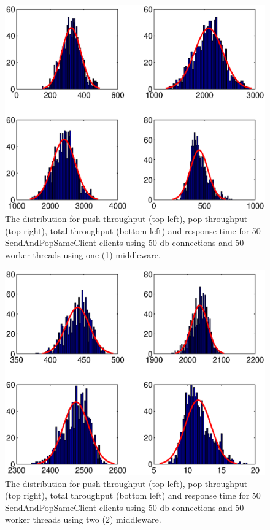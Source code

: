 \documentclass{article}
\begin{document}
        \begin{figure}[hbtp]
        \centering
        \includegraphics[scale=1]{img/histfit_1middleware_push_rop_total_resptime.eps}
        \caption{The distribution for push throughput (top left), pop throughput (top right), total throughput (bottom left) and response time for 50 SendAndPopSameClient clients using 50 db-connections and 50 worker threads using one (1) middleware.}
        \end{figure}
        
        \begin{figure}[hbtp]
        \centering
        \includegraphics[scale=1]{img/histfit_10middleware_push_rop_total_resptime.eps}
        \caption{The distribution for push throughput (top left), pop throughput (top right), total throughput (bottom left) and response time for 50 SendAndPopSameClient clients using 50 db-connections and 50 worker threads using two (2) middleware.}
        \end{figure}
        
\end{document}
